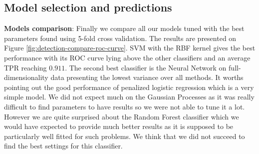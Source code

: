 \documentclass{article}
\begin{document}
  \subsection{Model selection and predictions}
    \textbf{Models comparison}: Finally we compare all our models tuned with the best parameters found using 5-fold cross validation. The results are presented on Figure \ref{fig:detection-compare-roc-curve}. SVM with the RBF kernel gives the best performance with its ROC curve lying above the other classifiers and an average TPR reaching $0.911$. The second best classifier is the Neural Network on full-dimensionality data presenting the lowest variance over all methods. It worths pointing out the good performance of penalized logistic regression which is a very simple model. We did not expect much on the Gaussian Processes as it was really difficult to find parameters to have results so we were not able to tune it a lot. However we are quite surprised about the Random Forest classifier which we would have expected to provide much better results as it is supposed to be particularly well fitted for such problems. We think that we did not succeed to find the best settings for this classifier.
\end{document}
